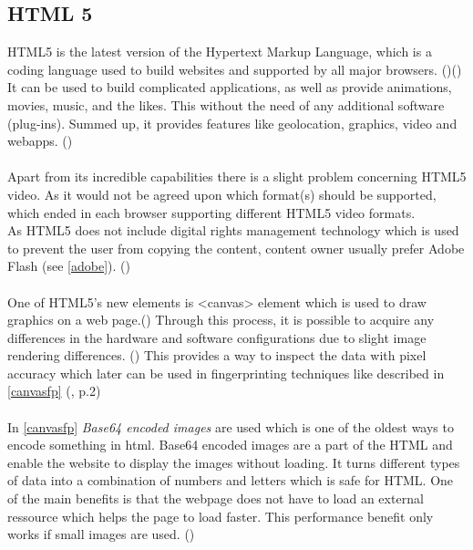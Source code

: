 \subsection{HTML 5}\label{html5}
HTML5 is the latest version of the Hypertext Markup Language, which is a coding language used to build websites and supported by all major browsers. (\textcite{pixel18})(\textcite{marshall17}) It can be used to build complicated applications, as well as provide animations, movies, music, and the likes. This without the need of any additional software (plug-ins). Summed up, it provides features like geolocation, graphics, video and webapps. (\textcite{marshall17})\\\\
Apart from its incredible capabilities there is a slight problem concerning HTML5 video. As it would not be agreed upon which format(s) should be supported, which ended in each browser supporting different HTML5 video formats.\\
As HTML5 does not include digital rights management technology which is used to prevent the user from copying the content, content owner usually prefer Adobe Flash (see \autoref{adobe}). (\textcite{marshall17})\\\\
One of HTML5's new elements is <canvas> element which is used to draw graphics on a web page.(\textcite{pixel18}) Through this process, it is possible to acquire any differences in the hardware and software configurations due to slight image rendering differences. (\textcite{amiunique}) This provides a way to inspect the data with pixel accuracy which later can be used in fingerprinting techniques like described in \autoref{canvasfp} (\textcite{mowery12}, p.2) \\\\
In \autoref{canvasfp} \textit{Base64 encoded images} are used which is one of the oldest ways to encode something in html. Base64 encoded images are a part of the HTML and enable the website to display the images without loading. It turns different types of data into a combination of numbers and letters which is safe for HTML. One of the main benefits is that the webpage does not have to load an external ressource which helps the page to load faster. This performance benefit only works if small images are used. (\textcite{sexton15})

